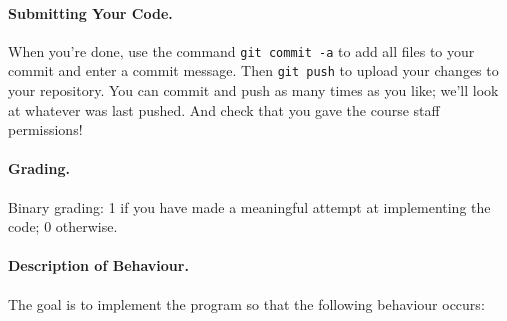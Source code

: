 \documentclass[a4paper]{report}
\begin{document}
\paragraph{Submitting Your Code.} When you're done, use the command \texttt{git commit -a} to add all files to your commit and enter a commit message. Then \texttt{git push} to upload your changes to your repository. You can commit and push as many times as you like; we'll look at whatever was last pushed. And check that you gave the course staff permissions!

\paragraph{Grading.} Binary grading: 1 if you have made a meaningful attempt at implementing the code; 0 otherwise.

\paragraph{Description of Behaviour.} The goal is to implement the program so that the following behaviour occurs:
\end{document}
